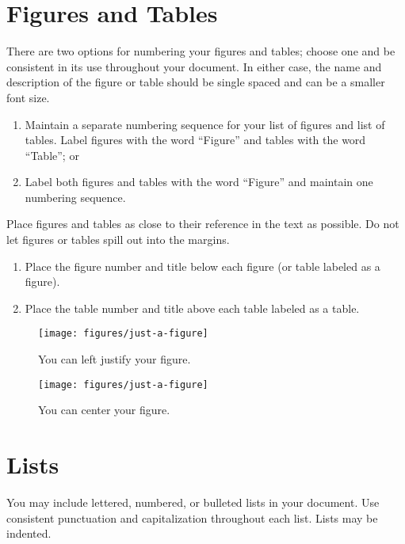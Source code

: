 \section{Figures and Tables}

There are two options for numbering your figures and tables; choose one and be consistent in its use throughout your document.
In either case, the name and description of the figure or table should be single spaced and can be a smaller font size.

\begin{enumerate}
	\item Maintain a separate numbering sequence for your list of figures and list of tables.
Label figures with the word ``Figure'' and tables with the word ``Table''; or
	\item Label both figures and tables with the word ``Figure'' and maintain one numbering sequence.
\end{enumerate}

Place figures and tables as close to their reference in the text as possible.
Do not let figures or tables spill out into the margins.

\begin{enumerate}
	\item Place the figure number and title below each figure (or table labeled as a figure).
	\item Place the table number and title above each table labeled as a table.
\end{enumerate}

\begin{figure}
    \texttt{[image: figures/just-a-figure]}
    \captionstyle{\raggedright}
    \caption[Left justified figure]{You can left justify your figure.}
    \label{fig:left-justified}
\end{figure}

\begin{figure}
    \centering
    \texttt{[image: figures/just-a-figure]}
    \caption[Centered figure]{You can center your figure.}
    \label{fig:centered}
\end{figure}


\section{Lists}

You may include lettered, numbered, or bulleted lists in your document.
Use consistent punctuation and capitalization throughout each list.
Lists may be indented.

